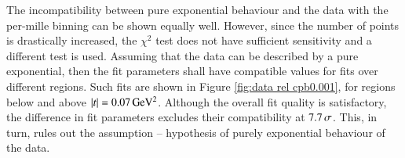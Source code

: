 
The incompatibility between pure exponential behaviour and the data with the per-mille binning can be shown equally well. However, since the number of points is drastically increased, the $\chi^2$ test does not have sufficient sensitivity and a different test is used. Assuming that the data can be described by a pure exponential, then the fit parameters shall have compatible values for fits over different regions. Such fits are shown in Figure \ref{fig:data rel cpb0.001}, for regions below and above $|t| = 0.07\,{\rm GeV^2}$. Although the overall fit quality is satisfactory, the difference in fit parameters excludes their compatibility at $7.7\,{\rm \sigma}$. This, in turn, rules out the assumption -- hypothesis of purely exponential behaviour of the data.


